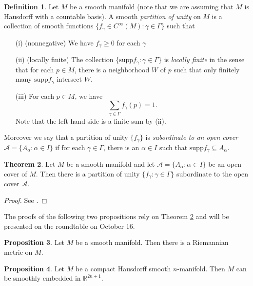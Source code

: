 \documentclass{amsart}
\numberwithin{equation}{section}
\newcommand{\bR}{\mathbb{R}}
\theoremstyle{definition}
\newtheorem{definition}{Definition} [section]
\theoremstyle{theorem}
\newtheorem{proposition}[definition]{Proposition}
\newtheorem{theorem}[definition]{Theorem}
\begin{document}
\begin{definition}
Let $M$ be a smooth manifold (note that we are assuming that $M$ is Hausdorff with a countable basis). A smooth {\em partition of unity} on $M$ is a collection of smooth functions $\{f_\gamma \in C^\infty(M) : \gamma \in \Gamma\}$ such that 
\begin{enumerate}
\item[(i)] (nonnegative) We have $f_\gamma \ge 0$ for each $\gamma$
\item[(ii)] (locally finite) The collection $\{\text{supp} f_\gamma : \gamma \in \Gamma\}$ is {\em locally finite} in the sense that for each $p \in M$, there is a neighborhood $W$ of $p$ such that only finitely many $\text{supp} f_\gamma$ intersect $W$. 
\item[(iii)] For each $p \in M$, we have 
\[
\sum_{\gamma \in \Gamma}f_\gamma(p) = 1.
\]
Note that the left hand side is a finite sum by (ii). 
\end{enumerate}
Moreover we say that a partition of unity $\{f_\gamma\}$ is {\em subordinate to an open cover} $\mathcal{A} = \{A_\alpha : \alpha  \in I \}$ if for each $\gamma \in \Gamma$, there is an $\alpha \in I$ such that $\text{supp} f_\gamma \subseteq A_\alpha$. 
\end{definition}

\begin{theorem}\label{partition-of-unity}
Let $M$ be a smooth manifold and let $\mathcal{A} = \{A_\alpha : \alpha \in I\}$ be an open cover of $M$. Then there is a partition of unity $\{f_\gamma : \gamma \in \Gamma\}$ subordinate to the open cover $\mathcal{A}$. 
\end{theorem}

\begin{proof}
See \cite[Chapter V Section 4]{Bo}. 
\end{proof}

The proofs of the following two propositions rely on Theorem  \ref{partition-of-unity}
and will be presented on the roundtable on October 16.

\begin{proposition}
Let $M$ be a smooth manifold. Then there is a Riemannian metric on $M$. 
\end{proposition}


\begin{proposition}
Let $M$ be a compact Hausdorff smooth $n$-manifold. Then $M$ can be smoothly embedded in $\bR^{2n+1}$. 
\end{proposition}
\end{document}
